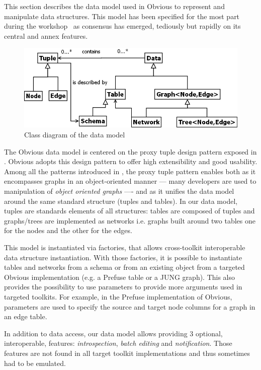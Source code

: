 This section describes the data model used in Obvious to represent and
manipulate data structures.  This model has been specified for the
most part during the workshop~\cite{vismaster2008} as consensus has
emerged, tediously but rapidly on its central and annex features.

\begin{figure}[!ht]
\includegraphics[width=\columnwidth]{figures/obviousdataclass}
\caption{Class diagram of the data model}
\label{fig:datamodel}
\end{figure}

The Obvious data model is centered on the proxy tuple design pattern
exposed in \cite{DesignPatternsIV}. Obvious adopts this design pattern
to offer high extensibility and good usability.  Among all the patterns
introduced in \cite{DesignPatternsIV}, the proxy tuple pattern enables
both as it encompasses graphs in an object-oriented manner --- many
developers are used to manipulation of \emph{object oriented graphs}
---- and as it unifies the data model around the same standard
structure (tuples and tables). In our data model, tuples are standards
elements of all structures: tables are composed of tuples and
graphs/trees are implemented as networks i.e. graphs built around two
tables one for the nodes and the other for the edges.

This model is instantiated via factories, that allows cross-toolkit
interoperable data structure instantiation. With those factories, it
is possible to instantiate tables and networks from a schema or from
an existing object from a targeted Obvious implementation (e.g. a
Prefuse table or a JUNG graph). This also provides the possibility
to use parameters to provide more arguments used in targeted
toolkits. For example, in the Prefuse implementation of Obvious,
parameters are used to specify the source and target node columns for
a graph in an edge table.

In addition to data access, our data model allows providing 3
optional, interoperable, features: \emph{introspection}, \emph{batch
  editing} and \emph{notification}. Those features are not found in
all target toolkit implementations and thus sometimes had to be
emulated.
 
